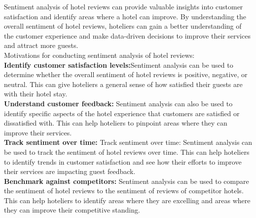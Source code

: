 \documentclass[a4paper, 12pt]{report}
\begin{document}
Sentiment analysis of hotel reviews can provide valuable insights into customer satisfaction and identify areas where a hotel can improve. By understanding the overall sentiment of hotel reviews, hoteliers can gain a better understanding of the customer experience and make data-driven decisions to improve their services and attract more guests.\\
Motivations for conducting sentiment analysis of hotel reviews:\\
\textbf{Identify customer satisfaction levels:}Sentiment analysis can be used to determine whether the overall sentiment of hotel reviews is positive, negative, or neutral. This can give hoteliers a general sense of how satisfied their guests are with their hotel stay.\\
\textbf{Understand customer feedback:} Sentiment analysis can also be used to identify specific aspects of the hotel experience that customers are satisfied or dissatisfied with. This can help hoteliers to pinpoint areas where they can improve their services.\\
\textbf{Track sentiment over time:}
Track sentiment over time: Sentiment analysis can be used to track the sentiment of hotel reviews over time. This can help hoteliers to identify trends in customer satisfaction and see how their efforts to improve their services are impacting guest feedback.\\
\textbf{Benchmark against competitors:} Sentiment analysis can be used to compare the sentiment of hotel reviews to the sentiment of reviews of competitor hotels. This can help hoteliers to identify areas where they are excelling and areas where they can improve their competitive standing.
\end{document}
